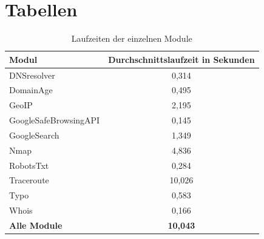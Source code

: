 




\listoftodos %

\tableofcontents %











\chapter{Tabellen}

\begin{table}
	\begin{center}
		\begin{tabular}{ l c }
			\toprule
			\textbf{Modul} & \textbf{Durchschnittslaufzeit in Sekunden}\\
			\midrule   
			DNSresolver            & 0,314 \\
			DomainAge               & 0,495 \\
			GeoIP                   & 2,195 \\
			GoogleSafeBrowsingAPI   & 0,145 \\
			GoogleSearch            & 1,349 \\
			Nmap                    & 4,836 \\
			RobotsTxt               & 0,284 \\
			Traceroute              & 10,026 \\
			Typo                    & 0,583 \\
			Whois                   & 0,166 \\
			\midrule
			\textbf{Alle Module}    & \textbf{10,043} \\
			\bottomrule
		\end{tabular}
		\caption{Laufzeiten der einzelnen Module}\label{tab.laufzeit}
	\end{center}
\end{table}


